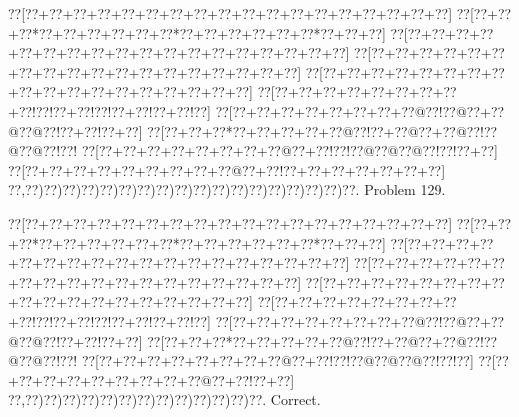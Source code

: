 \documentclass[a5paper]{article}
\begin{document}
\newpage
\begin{center}
{\goo
\0??[\0??+\0??+\0??+\0??+\0??+\0??+\0??+\0??+\0??+\0??+\0??+\0??+\0??+\0??+\0??+\0??+\0??+\0??]
\0??[\0??+\0??+\0??*\0??+\0??+\0??+\0??+\0??+\0??*\0??+\0??+\0??+\0??+\0??+\0??*\0??+\0??+\0??]
\0??[\0??+\0??+\0??+\0??+\0??+\0??+\0??+\0??+\0??+\0??+\0??+\0??+\0??+\0??+\0??+\0??+\0??+\0??]
\0??[\0??+\0??+\0??+\0??+\0??+\0??+\0??+\0??+\0??+\0??+\0??+\0??+\0??+\0??+\0??+\0??+\0??+\0??]
\0??[\0??+\0??+\0??+\0??+\0??+\0??+\0??+\0??+\0??+\0??+\0??+\0??+\0??+\0??+\0??+\0??+\0??+\0??]
\0??[\0??+\0??+\0??+\0??+\0??+\0??+\0??+\0??+\0??!\0??!\0??+\0??!\0??!\0??+\0??!\0??+\0??!\0??]
\0??[\0??+\0??+\0??+\0??+\0??+\0??+\0??+\0??@\0??!\0??@\0??+\0??@\0??@\0??!\0??+\0??!\0??+\0??]
\0??[\0??+\0??+\0??*\0??+\0??+\0??+\0??+\0??@\0??!\0??+\0??@\0??+\0??@\0??!\0??@\0??@\0??!\0??!
\0??[\0??+\0??+\0??+\0??+\0??+\0??+\0??+\0??@\0??+\0??!\0??!\0??@\0??@\0??@\0??!\0??!\0??+\0??]
\0??[\0??+\0??+\0??+\0??+\0??+\0??+\0??+\0??+\0??@\0??+\0??!\0??+\0??+\0??+\0??+\0??+\0??+\0??]
\0??,\0??)\0??)\0??)\0??)\0??)\0??)\0??)\0??)\0??)\0??)\0??)\0??)\0??)\0??)\0??)\0??)\0??)\0??.
}
Problem 129.

\end{center}
\begin{center}
{\goo
\0??[\0??+\0??+\0??+\0??+\0??+\0??+\0??+\0??+\0??+\0??+\0??+\0??+\0??+\0??+\0??+\0??+\0??+\0??]
\0??[\0??+\0??+\0??*\0??+\0??+\0??+\0??+\0??+\0??*\0??+\0??+\0??+\0??+\0??+\0??*\0??+\0??+\0??]
\0??[\0??+\0??+\0??+\0??+\0??+\0??+\0??+\0??+\0??+\0??+\0??+\0??+\0??+\0??+\0??+\0??+\0??+\0??]
\0??[\0??+\0??+\0??+\0??+\0??+\0??+\0??+\0??+\0??+\0??+\0??+\0??+\0??+\0??+\0??+\0??+\0??+\0??]
\0??[\0??+\0??+\0??+\0??+\0??+\0??+\0??+\0??+\0??+\0??+\0??+\0??+\0??+\0??+\0??+\0??+\0??+\0??]
\0??[\0??+\0??+\0??+\0??+\0??+\0??+\0??+\0??+\0??!\0??!\0??+\0??!\0??!\0??+\0??!\0??+\0??!\0??]
\0??[\0??+\0??+\0??+\0??+\0??+\0??+\0??+\0??@\0??!\0??@\0??+\0??@\0??@\0??!\0??+\0??!\0??+\0??]
\0??[\0??+\0??+\0??*\0??+\0??+\0??+\0??+\0??@\0??!\0??+\0??@\0??+\0??@\0??!\0??@\0??@\0??!\0??!
\0??[\0??+\0??+\0??+\0??+\0??+\0??+\0??+\0??@\0??+\0??!\0??!\0??@\0??@\0??@\0??!\0??!\0??]
\0??[\0??+\0??+\0??+\0??+\0??+\0??+\0??+\0??+\0??@\0??+\0??!\0??+\0??]
\0??,\0??)\0??)\0??)\0??)\0??)\0??)\0??)\0??)\0??)\0??)\0??)\0??)\0??.
}
Correct. 

\end{center}
\end{document}
